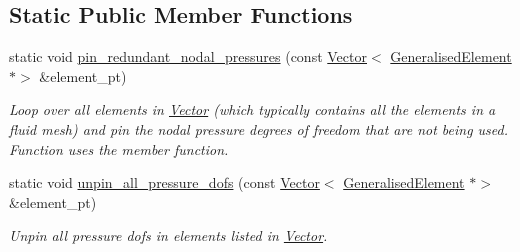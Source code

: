 \subsection*{Static Public Member Functions}
\begin{DoxyCompactItemize}
\item 
static void \hyperlink{classoomph_1_1RefineableLinearisedNavierStokesEquations_a3e780af67f06310eaf4417fc3f7b22dd}{pin\+\_\+redundant\+\_\+nodal\+\_\+pressures} (const \hyperlink{classoomph_1_1Vector}{Vector}$<$ \hyperlink{classoomph_1_1GeneralisedElement}{Generalised\+Element} $\ast$$>$ \&element\+\_\+pt)
\begin{DoxyCompactList}\small\item\em Loop over all elements in \hyperlink{classoomph_1_1Vector}{Vector} (which typically contains all the elements in a fluid mesh) and pin the nodal pressure degrees of freedom that are not being used. Function uses the member function. \end{DoxyCompactList}\item 
static void \hyperlink{classoomph_1_1RefineableLinearisedNavierStokesEquations_a6852ab1f620420c2f2f532a1a7c35368}{unpin\+\_\+all\+\_\+pressure\+\_\+dofs} (const \hyperlink{classoomph_1_1Vector}{Vector}$<$ \hyperlink{classoomph_1_1GeneralisedElement}{Generalised\+Element} $\ast$$>$ \&element\+\_\+pt)
\begin{DoxyCompactList}\small\item\em Unpin all pressure dofs in elements listed in \hyperlink{classoomph_1_1Vector}{Vector}. \end{DoxyCompactList}\end{DoxyCompactItemize}
